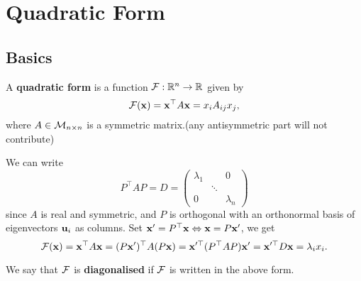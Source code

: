 \documentclass[10pt]{article}
\begin{document}
    \section{Quadratic Form}
    \subsection{Basics}
    \begin{definition}

        A \textbf{quadratic form} is a function ${\mathcal{F}}: \mathbb{R}^{n}\to \mathbb{R}$ given by
        \[
            {\mathcal{F}}({\bf x}) = {\bf x}^{\top}A{\bf x}=x_iA_{ij}x_j,
        \]
        where $A\in {\mathcal{M}}_{n\times n}$ is a symmetric matrix.(any antisymmetric part will not contribute)
    \end{definition}
    We can write 
    \[
        P^{\top}AP=D=\begin{pmatrix}
            \lambda_1&&0\\
            &\ddots&\\
            0&&\lambda_n
        \end{pmatrix}
    \]
    since $A$ is real and symmetric, and $P$ is orthogonal with an orthonormal basis of eigenvectors ${\bf u}_i$ as columns. Set $ {\bf x}'=P^{\top}{\bf x} \Leftrightarrow {\bf x}=P{\bf x}' $, we get 
    \[
        {\mathcal{F}}({\bf x})= {\bf x}^{\top}A{\bf x}=(P{\bf x}')^{\top}A(P{\bf x})={\bf x}'^{\top}(P^{\top}AP){\bf x}'={\bf x}'^{\top}D{\bf x} = \lambda_i x_i.
    \]
    \begin{definition}
        We say that ${\mathcal{F}}$ is \textbf{diagonalised} if ${\mathcal{F}}$ is written in the above form.
    \end{definition}
\end{document}
